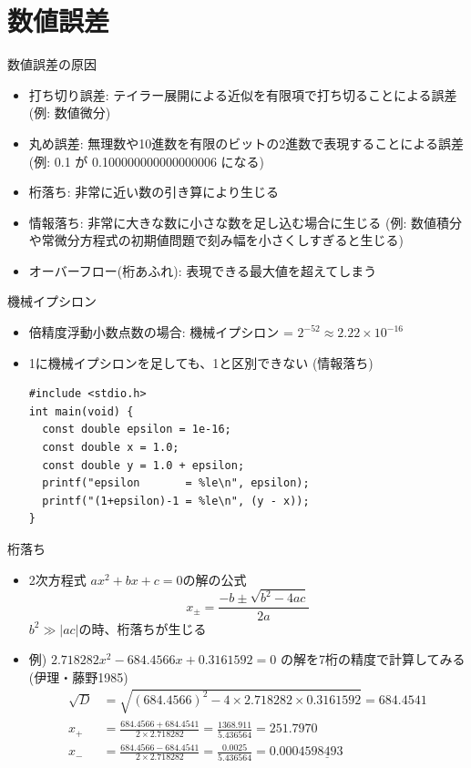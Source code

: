 \section{数値誤差}

\begin{frame}[t,fragile]{数値誤差の原因}
  \begin{itemize}
    \setlength{\itemsep}{1em}
  \item 打ち切り誤差: テイラー展開による近似を有限項で打ち切ることによる誤差
    (例: 数値微分)
  \item 丸め誤差: 無理数や10進数を有限のビットの2進数で表現することによる誤差
    (例: 0.1 が 0.100000000000000006 になる)
  \item 桁落ち: 非常に近い数の引き算により生じる
  \item 情報落ち: 非常に大きな数に小さな数を足し込む場合に生じる
    (例: 数値積分や常微分方程式の初期値問題で刻み幅を小さくしすぎると生じる)
  \item オーバーフロー(桁あふれ): 表現できる最大値を超えてしまう
  \end{itemize}
\end{frame}

\begin{frame}[t,fragile]{機械イプシロン}
  \begin{itemize}
    \setlength{\itemsep}{1em}
  \item 倍精度浮動小数点数の場合: 機械イプシロン = $2^{-52} \approx 2.22 \times 10^{-16}$
  \item 1に機械イプシロンを足しても、1と区別できない (情報落ち)
      \begin{lstlisting}
#include <stdio.h>
int main(void) {
  const double epsilon = 1e-16;
  const double x = 1.0;
  const double y = 1.0 + epsilon;
  printf("epsilon       = %le\n", epsilon);
  printf("(1+epsilon)-1 = %le\n", (y - x));
}      \end{lstlisting}
  \end{itemize}
\end{frame}

\begin{frame}[t,fragile]{桁落ち}
  \begin{itemize}
    \setlength{\itemsep}{1em}
  \item 2次方程式 $ax^2+bx+c=0$の解の公式
    \[
    x_{\pm} = \frac{-b \pm \sqrt{b^2-4ac}}{2a}
    \]
    $b^2 \gg |ac|$の時、桁落ちが生じる
  \item 例) $2.718282x^2 - 684.4566x+0.3161592=0$ の解を7桁の精度で計算してみる(伊理・藤野1985)
    \begin{align*}
      \sqrt{D} &= \sqrt{(684.4566)^2 - 4 \times 2.718282 \times 0.3161592} = 684.4541 \\
      x_+ &= \frac{684.4566+684.4541}{2 \times 2.718282} = \frac{1368.911}{5.436564} = 251.7970 \\
      x_- &= \frac{684.4566-684.4541}{2 \times 2.718282} = \frac{0.0025}{5.436564} = 0.00045\underline{98493}
    \end{align*}
  \end{itemize}
\end{frame}

